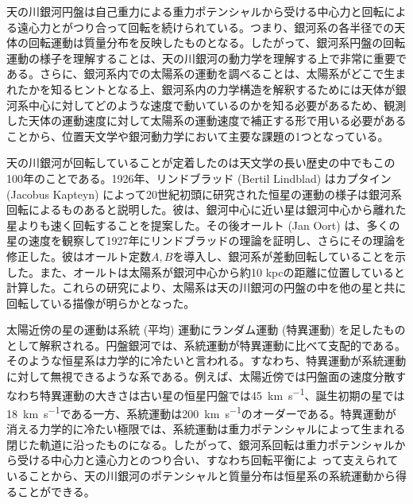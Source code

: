 
天の川銀河円盤は自己重力による重力ポテンシャルから受ける中心力と回転による遠心力とがつり合って回転を続けられている。つまり、銀河系の各半径での天体の回転運動は質量分布を反映したものとなる。したがって、銀河系円盤の回転運動の様子を理解することは、天の川銀河の動力学を理解する上で非常に重要である。さらに、銀河系内での太陽系の運動を調べることは、太陽系がどこで生まれたかを知るヒントとなる上、銀河系内の力学構造を解釈するためには天体が銀河系中心に対してどのような速度で動いているのかを知る必要があるため、観測した天体の運動速度に対して太陽系の運動速度で補正する形で用いる必要があることから、位置天文学や銀河動力学において主要な課題の1つとなっている。

天の川銀河が回転していることが定着したのは天文学の長い歴史の中でもこの100年のことである。1926年、リンドブラッド  (Bertil Lindblad) はカプタイン (Jacobus Kapteyn) によって20世紀初頭に研究された恒星の運動の様子は銀河系回転によるものあると説明した。彼は、銀河中心に近い星は銀河中心から離れた星よりも速く回転することを提案した。その後オールト (Jan Oort) は、多くの星の速度を観察して1927年にリンドブラッドの理論を証明し、さらにその理論を修正した。彼はオールト定数$A,B$を導入し、銀河系が差動回転していることを示した。また、オールトは太陽系が銀河中心から約10 kpcの距離に位置していると計算した。これらの研究により、太陽系は天の川銀河の円盤の中を他の星と共に回転している描像が明らかとなった。

太陽近傍の星の運動は系統 (平均) 運動にランダム運動 (特異運動) を足したものとして解釈される。円盤銀河では、系統運動が特異運動に比べて支配的である。そのような恒星系は力学的に冷たいと言われる。すなわち、特異運動が系統運動に対して無視できるような系である。例えば、太陽近傍では円盤面の速度分散すなわち特異運動の大きさは古い星の恒星円盤では\SI{45}{km.s^{-1}}、誕生初期の星では\SI{18}{km.s^{-1}}である一方、系統運動は\SI{200}{km.s^{-1}}のオーダーである。特異運動が消える力学的に冷たい極限では、系統運動は重力ポテンシャルによって生まれる閉じた軌道に沿ったものになる。したがって、銀河系回転は重力ポテンシャルから受ける中心力と遠心力とのつり合い、すなわち回転平衡によ
って支えられていることから、天の川銀河のポテンシャルと質量分布は恒星系の系統運動から得ることができる。

